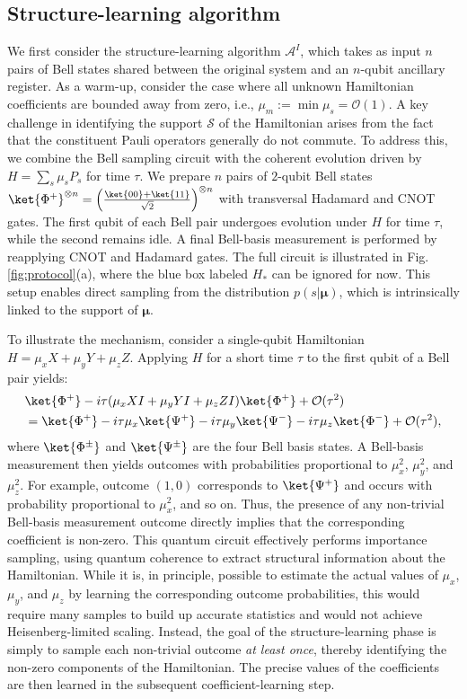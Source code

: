 \documentclass[twocolumn,superscriptaddress,aps,showpacs,amsmath,amstex,amssymb,citeautoscript,floatfix,pra,preprintnumbers]{revtex4-2}
\newcounter{alg}
\theoremstyle{plain}
\theoremstyle{plain}
\theoremstyle{plain}
\theoremstyle{plain}
\theoremstyle{plain}
\theoremstyle{plain}
\newcommand{\eqs}[1]{\begin{equation}\begin{split}#1\end{split}\end{equation}}
\newcommand{\figref}[1]{Fig.\,\ref{#1}}
\begin{document}
\subsection{Structure-learning algorithm}
We first consider the structure-learning algorithm $\mathcal{A}^I$, which takes as input $n$ pairs of Bell states shared between the original system and an $n$-qubit ancillary register. As a warm-up, consider the case where all unknown Hamiltonian coefficients are bounded away from zero, i.e., $\mu_m := \min \mu_s = \mathcal{O}(1)$. A key challenge in identifying the support $\mathcal{S}$ of the Hamiltonian arises from the fact that the constituent Pauli operators generally do not commute.
To address this, we combine the Bell sampling circuit with the coherent evolution driven by $H = \sum_{s}\mu_s P_s$ for time $\tau$. We prepare $n$ pairs of $2$-qubit Bell states $\ket{\Phi^{+}}^{\otimes n}= \left(\frac{\ket{00}+\ket{11}}{\sqrt{2}}\right)^{\otimes n}$ with transversal Hadamard and CNOT gates. The first qubit of each Bell pair undergoes evolution under $H$ for time $\tau$, while the second remains idle. A final Bell-basis measurement is performed by reapplying CNOT and Hadamard gates. The full circuit is illustrated in \figref{fig:protocol}(a), where the blue box labeled $H_*$ can be ignored for now. This setup enables direct sampling from the distribution $p(s|\bm{\mu})$, which is intrinsically linked to the support of $\bm{\mu}$. 

To illustrate the mechanism, consider a single-qubit Hamiltonian $H = \mu_x X + \mu_y Y + \mu_z Z$. Applying $H$ for a short time $\tau$ to the first qubit of a Bell pair yields:
\eqs{
&\ket{\Phi^{+}}-i\tau(\mu_x XI+\mu_y YI+\mu_z ZI)\ket{\Phi^{+}}+\mathcal{O}(\tau^2)\\
&=\ket{\Phi^{+}}-i\tau \mu_x\ket{\Psi^{+}}-i\tau\mu_y\ket{\Psi^{-}}-i\tau \mu_z \ket{\Phi^{-}}+\mathcal{O}(\tau^2),\label{eq:single_qubit_bell}
}
where $\ket{\Phi^{\pm}}$ and $\ket{\Psi^{\pm}}$ are the four Bell basis states. A Bell-basis measurement then yields outcomes with probabilities proportional to $\mu_x^2$, $\mu_y^2$, and $\mu_z^2$. For example, outcome $(1,0)$ corresponds to $\ket{\Psi^+}$ and occurs with probability proportional to $\mu_x^2$, and so on. Thus, the presence of any non-trivial Bell-basis measurement outcome directly implies that the corresponding coefficient is non-zero. This quantum circuit effectively performs importance sampling, using quantum coherence to extract structural information about the Hamiltonian. While it is, in principle, possible to estimate the actual values of $\mu_x$, $\mu_y$, and $\mu_z$ by learning the corresponding outcome probabilities, this would require many samples to build up accurate statistics and would not achieve Heisenberg-limited scaling. Instead, the goal of the structure-learning phase is simply to sample each non-trivial outcome \emph{at least once}, thereby identifying the non-zero components of the Hamiltonian. The precise values of the coefficients are then learned in the subsequent coefficient-learning step.
\end{document}
